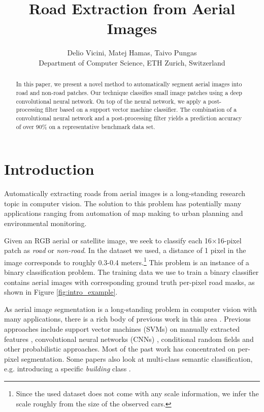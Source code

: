 \documentclass[10pt,conference,compsocconf]{IEEEtran}
\begin{document}
\title{Road Extraction from Aerial Images}
\author{
  Delio Vicini, Matej Hamas, Taivo Pungas\\
  Department of Computer Science, ETH Zurich, Switzerland
}

\maketitle

\begin{abstract}
In this paper, we present a novel method to automatically segment aerial images into road and non-road patches. Our technique classifies small image patches using a deep convolutional neural network. On top of the neural network, we apply a post-processing filter based on a support vector machine classifier. The combination of a convolutional neural network and a post-processing filter yields a prediction accuracy of over 90\% on a representative benchmark data set.
\end{abstract}

\section{Introduction}
\label{sec:intro}

Automatically extracting roads from aerial images is a long-standing research topic in computer vision. The solution to this problem has potentially many applications ranging from automation of map making to urban planning and environmental monitoring.

Given an RGB aerial or satellite image, we seek to classify each 16$\times$16-pixel patch as \textit{road} or \textit{non-road}. In the dataset we used, a distance of 1 pixel in the image corresponds to roughly 0.3-0.4 meters.\footnote{Since the used dataset does not come with any scale information, we infer the scale roughly from the size of the observed cars.} This problem is an instance of a binary classification problem. The training data we use to train a binary classifier contains aerial images with corresponding ground truth per-pixel road masks, as shown in Figure \ref{fig:intro_example}.

\par
As aerial image segmentation is a long-standing problem in computer vision with many applications, there is a rich body of previous work in this area \cite{Huang.2002, MnihThesis.2013, Long.2014, Montoya.2015, Saito.2015}. Previous approaches include support vector machines (SVMs) on manually extracted features \cite{Huang.2002}, convolutional neural networks (CNNs) \cite{Long.2014, Saito.2015}, conditional random fields \cite{Montoya.2015} and other probabilistic approaches. Most of the past work has concentrated on per-pixel segmentation. Some papers also look at multi-class semantic classification, e.g. introducing a specific \textit{building} class \cite{Saito.2015}.
\end{document}
